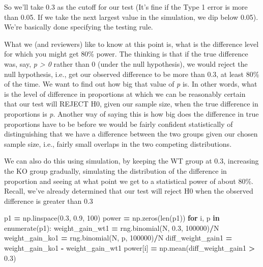 \documentclass[
  letterpaper,
]{scrbook}
\newenvironment{Shaded}{\begin{snugshade}}{\end{snugshade}}
\newcommand{\BuiltInTok}[1]{#1}
\newcommand{\ControlFlowTok}[1]{\textcolor[rgb]{0.13,0.29,0.53}{\textbf{#1}}}
\newcommand{\DecValTok}[1]{\textcolor[rgb]{0.00,0.00,0.81}{#1}}
\newcommand{\FloatTok}[1]{\textcolor[rgb]{0.00,0.00,0.81}{#1}}
\newcommand{\KeywordTok}[1]{\textcolor[rgb]{0.13,0.29,0.53}{\textbf{#1}}}
\newcommand{\NormalTok}[1]{#1}
\newcommand{\OperatorTok}[1]{\textcolor[rgb]{0.81,0.36,0.00}{\textbf{#1}}}
\begin{document}
So we'll take 0.3 as the cutoff for our test (It's fine if the Type 1 error is more than 0.05. If we take the next largest value in the simulation, we dip below 0.05). We're basically done specifying the testing rule.

What we (and reviewers) like to know at this point is, what is the difference level for which you might get 80\% power. The thinking is that if the true difference was, say, \emph{p \textgreater{} 0} rather than 0 (under the null hypothesis), we would reject the null hypothesis, i.e., get our observed difference to be more than 0.3, at least 80\% of the time. We want to find out how big that value of \emph{p} is. In other words, what is the level of difference in proportions at which we can be reasonably certain that our test will REJECT H0, given our sample size, when the true difference in proportions is \emph{p}. Another way of saying this is how big does the difference in true proportions have to be before we would be fairly confident statistically of distinguishing that we have a difference between the two groups given our chosen sample size, i.e., fairly small overlaps in the two competing distributions.

We can also do this using simulation, by keeping the WT group at 0.3, increasing the KO group gradually, simulating the distribution of the difference in proportion and seeing at what point we get to a statistical power of about 80\%. Recall, we've already determined that our test will reject H0 when the observed difference is greater than 0.3

\begin{Shaded}
\begin{Highlighting}[]
\NormalTok{p1 }\OperatorTok{=}\NormalTok{ np.linspace(}\FloatTok{0.3}\NormalTok{, }\FloatTok{0.9}\NormalTok{, }\DecValTok{100}\NormalTok{)}
\NormalTok{power }\OperatorTok{=}\NormalTok{ np.zeros(}\BuiltInTok{len}\NormalTok{(p1))}
\ControlFlowTok{for}\NormalTok{ i, p }\KeywordTok{in} \BuiltInTok{enumerate}\NormalTok{(p1):}
\NormalTok{    weight\_gain\_wt1 }\OperatorTok{=}\NormalTok{ rng.binomial(N, }\FloatTok{0.3}\NormalTok{, }\DecValTok{100000}\NormalTok{)}\OperatorTok{/}\NormalTok{N}
\NormalTok{    weight\_gain\_ko1 }\OperatorTok{=}\NormalTok{ rng.binomial(N, p, }\DecValTok{100000}\NormalTok{)}\OperatorTok{/}\NormalTok{N}
\NormalTok{    diff\_weight\_gain1 }\OperatorTok{=}\NormalTok{ weight\_gain\_ko1 }\OperatorTok{{-}}\NormalTok{ weight\_gain\_wt1}
\NormalTok{    power[i] }\OperatorTok{=}\NormalTok{ np.mean(diff\_weight\_gain1 }\OperatorTok{\textgreater{}} \FloatTok{0.3}\NormalTok{)}
\end{Highlighting}
\end{Shaded}
\end{document}

